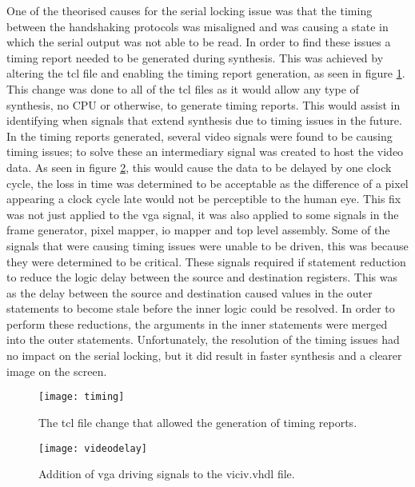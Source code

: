 \label{Ch5 Sec1 Sub2}

One of the theorised causes for the serial locking issue was that the timing between the handshaking protocols was misaligned and was causing a state in which the serial output was not able to be read. In order to find these issues a timing report needed to be generated during synthesis. This was achieved by altering the tcl file and enabling the timing report generation, as seen in figure \ref{fig:timing}. This change was done to all of the tcl files as it would allow any type of synthesis, no CPU or otherwise, to generate timing reports. This would assist in identifying when signals that extend synthesis due to timing issues in the future. In the timing reports generated, several video signals were found to be causing timing issues; to solve these an intermediary signal was created to host the video data. As seen in figure \ref{fig:videodelay}, this would cause the data to be delayed by one clock cycle, the loss in time was determined to be acceptable as the difference of a pixel appearing a clock cycle late would not be perceptible to the human eye. This fix was not just applied to the vga signal, it was also applied to some signals in the frame generator, pixel mapper, io mapper and top level assembly. Some of the signals that were causing timing issues were unable to be driven, this was because they were determined to be critical. These signals required if statement reduction to reduce the logic delay between the source and destination registers. This was as the delay between the source and destination caused values in the outer statements to become stale before the inner logic could be resolved. In order to perform these reductions, the arguments in the inner statements were merged into the outer statements. Unfortunately, the resolution of the timing issues had no impact on the serial locking, but it did result in faster synthesis and a clearer image on the screen.

\begin{figure}
  \centering
  \texttt{[image: timing]}
  \caption{The tcl file change that allowed the generation of timing reports.}
  \label{fig:timing}
\end{figure}

\begin{figure}
  \centering
  \texttt{[image: videodelay]}
  \caption{Addition of vga driving signals to the viciv.vhdl file.}
  \label{fig:videodelay}
\end{figure}

